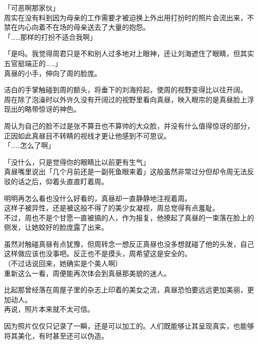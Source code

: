 「可恶啊那家伙」\\

周实在没有料到因为母亲的工作需要才被迫换上外出用打扮时的照片会流出来，不禁在内心向着不在场的母亲送去了大量的抱怨。\\

「……那样的打扮不适合我啊」

「是吗。我觉得周君只是不和别人过多地对上眼神，还让刘海遮住了眼睛，但其实五官挺端正的……」\\

真昼的小手，伸向了周的脸庞。

洁白的手掌触碰到周的额头，将垂下的刘海捋起，使周的视野变得比以往开阔。\\

周在除了泡澡时以外许久没有开阔过的视野里看向真昼，映入眼帘的是真昼脸上浮现出的略带惊讶的神色。

周认为自己的脸不过是张不算丑也不算帅的大众脸，并没有什么值得惊讶的部分，正因如此真昼目不转睛的视线才更让他感到不可思议。\\

「……怎么了啊」

「没什么，只是觉得你的眼睛比以前更有生气」\\

真昼嘴里说出「几个月前还是一副死鱼眼来着」这般虽然非常过分但却令周无法反驳的话之后，仰着头直直盯着周。

明明再怎么看也没什么好看的，真昼却一直静静地注视着周。\\

这样子被异性，还是被这般不得了的美少女凝视，周总觉得有点羞耻。\\

不过，周也不是个甘愿一直被搞的人，作为报复，他撩起了真昼的一束落在脸上的侧发，让她姣好的脸庞露了出来。

虽然对触碰真昼有点犹豫，但周转念一想反正真昼也没多想就碰了他的头发，自己这样做应该也没事吧。反正也不是摸头，周希望这是安全的。\\

（不过话说回来，她确实是个美人啊）\\

重新这么一看，周便能再次体会到真昼那美貌的迷人。

比起那曾经落在周屋子里的杂志上印着的美女之流，真昼恐怕要远远更加美丽，更加动人。\\

再说，照片本来就不太可信。

因为照片仅仅只记录了一瞬，还是可以加工的。人们既能够让其呈现真实，也能够将其美化，有时甚至还可以伪造。\\

